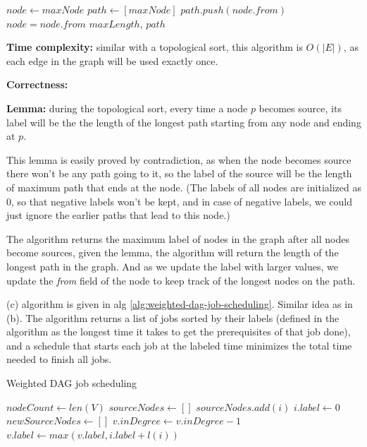 \documentclass{article}
\begin{document}
\begin{description}
\begin{algorithm}[h]
\begin{algorithmic}[1]
      \State $node \gets maxNode$
      \State $path \gets [maxNode]$
        \State $path.push(node.from)$
        \State $node = node.from$
      \EndWhile
      \State \Return $maxLength$, $path$
    \EndFunction
    
    \end{algorithmic}
  \end{algorithm}

  \textbf{Time complexity:} similar with a topological sort, this algorithm is $O(|E|)$, as each edge in the graph will be used exactly once.

  \textbf{Correctness:} 

  \textbf{Lemma:} during the topological sort, every time a node $p$ becomes source, its label will be the the length of the longest path starting from any node and ending at $p$. 

  This lemma is easily proved by contradiction, as when the node becomes source there won't be any path going to it, so the label of the source will be the length of maximum path that ends at the node. (The labels of all nodes are initialized as 0, so that negative labels won't be kept, and in case of negative labels, we could just ignore the earlier paths that lead to this node.)

  The algorithm returns the maximum label of nodes in the graph after all nodes become sources, given the lemma, the algorithm will return the length of the longest path in the graph. And as we update the label with larger values, we update the \textit{from} field of the node to keep track of the longest nodes on the path.

  (c) algorithm is given in alg \ref{alg:weighted-dag-job-scheduling}. Similar idea as in (b). The algorithm returns a list of jobs sorted by their labels (defined in the algorithm as the longest time it takes to get the prerequisites of that job done), and a schedule that starts each job at the labeled time minimizes the total time needed to finish all jobs.

  \begin{algorithm}[h]
  \caption{Weighted DAG job scheduling}
  \label{alg:weighted-dag-job-scheduling}
    \begin{algorithmic}[1]
  
      \State $nodeCount \gets len(V)$
      \State $sourceNodes \gets []$
          \State $sourceNodes.add(i)$
          \State $i.label \gets 0$
        \EndIf
      \EndFor
        \State $newSourceNodes \gets []$
            \State $v.inDegree \gets v.inDegree - 1$
            \State $v.label \gets max(v.label, i.label + l(i))$
            

\end{algorithmic}
\end{algorithm}
\end{description}
\end{document}
